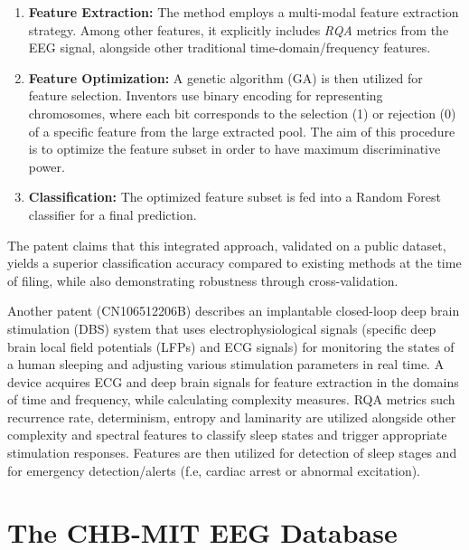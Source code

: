 \documentclass{article}
\begin{document}
				\begin{enumerate}
				    \item \textbf{Feature Extraction:} The method employs a multi-modal feature extraction strategy. 
					    Among other features, it explicitly includes \textit{RQA} metrics from the EEG signal, 
					    alongside other traditional time-domain/frequency features.
				    \item \textbf{Feature Optimization:} A genetic algorithm (GA) is then utilized for feature selection. 
					    Inventors use binary encoding for representing chromosomes, where each bit corresponds to the selection (1) or rejection (0) of a specific 
					    feature from the large extracted pool. The aim of this procedure is to optimize the feature subset in order
					    to have maximum discriminative power.
				    \item \textbf{Classification:} The optimized feature subset is fed into a Random Forest 
					    classifier for a final prediction. 
				\end{enumerate}

			The patent claims that this integrated approach, 
			validated on a public dataset, yields a superior classification 
			accuracy compared to existing methods at the time of filing, 
			while also demonstrating robustness through cross-validation.
		
		Another patent\cite{pat2019} (CN106512206B) describes an 
		implantable closed-loop deep brain stimulation (DBS) system that uses 
		electrophysiological signals (specific deep brain local field potentials (LFPs) and ECG  signals) for monitoring 
		the states of a human sleeping and adjusting various stimulation parameters in real time.
		A device acquires ECG and deep brain signals for feature extraction 
		in the domains of time and frequency, while 
		calculating complexity measures. 
		RQA metrics such recurrence rate, determinism, entropy and laminarity 
		are utilized alongside other complexity 
		and spectral features to classify sleep states and trigger appropriate stimulation responses.
		Features are then utilized for detection of sleep stages 
		and for emergency detection/alerts (f.e, cardiac arrest or abnormal excitation).



		\section{The CHB-MIT EEG Database}
\end{document}
